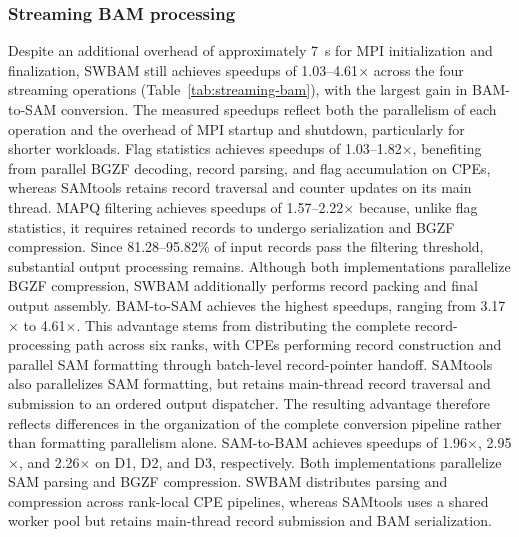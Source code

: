 \documentclass[lettersize,journal]{IEEEtran}
\begin{document}
\subsubsection{Streaming BAM processing}
Despite an additional overhead of approximately 7~s for MPI initialization and finalization, SWBAM still achieves speedups of 1.03--4.61$\times$ across the four streaming operations (Table~\ref{tab:streaming-bam}), with the largest gain in BAM-to-SAM conversion.
The measured speedups reflect both the parallelism of each operation and the overhead of MPI startup and shutdown, particularly for shorter workloads.
Flag statistics achieves speedups of 1.03--1.82$\times$, benefiting from parallel BGZF decoding, record parsing, and flag accumulation on CPEs, whereas SAMtools retains record traversal and counter updates on its main thread. 
MAPQ filtering achieves speedups of 1.57--2.22$\times$ because, unlike flag statistics, it requires retained records to undergo serialization and BGZF compression. 
Since 81.28--95.82\% of input records pass the filtering threshold, substantial output processing remains. 
Although both implementations parallelize BGZF compression, SWBAM additionally performs record packing and final output assembly. 
BAM-to-SAM achieves the highest speedups, ranging from 3.17$\times$ to 4.61$\times$. 
This advantage stems from distributing the complete record-processing path across six ranks, with CPEs performing record construction and parallel SAM formatting through batch-level record-pointer handoff. 
SAMtools also parallelizes SAM formatting, but retains main-thread record traversal and submission to an ordered output dispatcher. 
The resulting advantage therefore reflects differences in the organization of the complete conversion pipeline rather than formatting parallelism alone. 
SAM-to-BAM achieves speedups of 1.96$\times$, 2.95$\times$, and 2.26$\times$ on D1, D2, and D3, respectively. 
Both implementations parallelize SAM parsing and BGZF compression. 
SWBAM distributes parsing and compression across rank-local CPE pipelines, whereas SAMtools uses a shared worker pool but retains main-thread record submission and BAM serialization.
\end{document}
